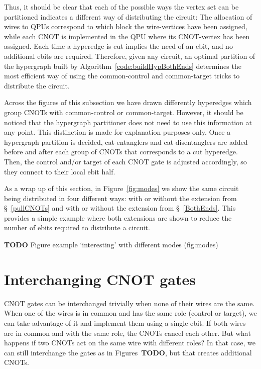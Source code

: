 Thus, it should be clear that each of the possible ways the vertex set can be partitioned indicates a different way of distributing the circuit: The allocation of wires to QPUs correspond to which block the wire-vertices have been assigned, while each CNOT is implemented in the QPU where its CNOT-vertex has been assigned. Each time a hyperedge is cut implies the need of an ebit, and no additional ebits are required. Therefore, given any circuit, an optimal partition of the hypergraph built by Algorithm~\ref{code:buildHypBothEnds} determines the most efficient way of using the common-control and common-target tricks to distribute the circuit.

Across the figures of this subsection we have drawn differently hyperedges which group CNOTs with common-control or common-target. However, it should be noticed that the hypergraph partitioner does not need to use this information at any point. This distinction is made for explanation purposes only. Once a hypergraph partition is decided, cat-entanglers and cat-disentanglers are added before and after each group of CNOTs that corresponds to a cut hyperedge. Then, the control and/or target of each CNOT gate is adjusted accordingly, so they connect to their local ebit half.

As a wrap up of this section, in Figure~\ref{fig:modes} we show the same circuit being distributed in four different ways: with or without the extension from \S~\ref{pullCNOTs} and with or without the extension from \S~\ref{BothEnds}. This provides a simple example where both extensions are shown to reduce the number of ebits required to distribute a circuit.

\textbf{TODO} Figure example `interesting' with different modes (fig:modes)

\section{Interchanging CNOT gates}

CNOT gates can be interchanged trivially when none of their wires are the same. When one of the wires is in common and has the same role (control or target), we can take advantage of it and implement them using a single ebit. If both wires are in common and with the same role, the CNOTs cancel each other. But what happens if two CNOTs act on the same wire with different roles? In that case, we can still interchange the gates as in Figures~\textbf{TODO}, but that creates additional CNOTs.

